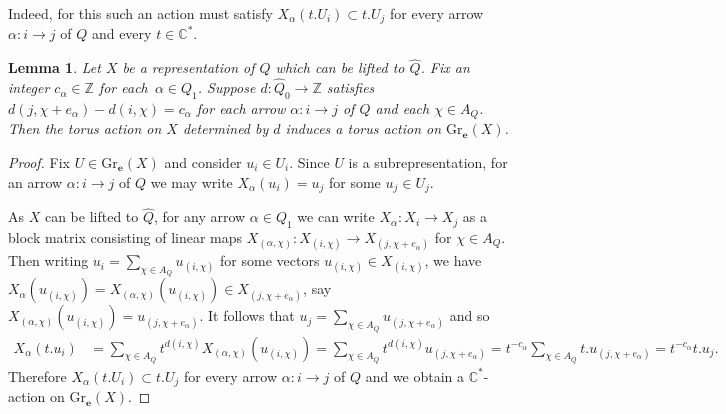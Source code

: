\documentclass{amsart}
\newtheorem{lemma}[theorem]{Lemma}
\numberwithin{equation}{section}
\newcommand{\bfe}{\mathbf{e}}
\newcommand{\Gr}{\mathrm{Gr}}
\newcommand{\CC}{\mathbb{C}}
\newcommand{\ZZ}{\mathbb{Z}}
\begin{document}
Indeed, for this such an action must satisfy $X_\alpha(t.U_i)\subset t.U_j$ for every arrow $\alpha:i\to j$ of $Q$ and every $t\in\CC^*$. 
\begin{lemma}
  Let $X$ be a representation of $Q$ which can be lifted to $\hat Q$.
  Fix an integer $c_\alpha\in\ZZ$ for each~$\alpha\in Q_1$.
  Suppose $d:\hat Q_0\to\ZZ$ satisfies $d(j,\chi+e_\alpha)-d(i,\chi)=c_\alpha$ for each arrow $\alpha:i\to j$ of $Q$ and each $\chi\in A_Q$.
  Then the torus action on $X$ determined by $d$ induces a torus action on $\Gr_\bfe(X)$.
\end{lemma}
\begin{proof} 
  Fix $U\in\Gr_\bfe(X)$ and consider $u_i\in U_i$.
  Since $U$ is a subrepresentation, for an arrow $\alpha:i\to j$ of $Q$ we may write $X_\alpha(u_i)=u_j$ for some $u_j\in U_j$.

  As $X$ can be lifted to $\hat Q$, for any arrow $\alpha\in Q_1$ we can write $X_\alpha:X_i\to X_j$ as a block matrix consisting of linear maps $X_{(\alpha,\chi)}:X_{(i,\chi)}\to X_{(j,\chi+e_\alpha)}$ for $\chi\in A_Q$.
  Then writing $u_i=\sum_{\chi\in A_Q} u_{(i,\chi)}$ for some vectors $u_{(i,\chi)}\in X_{(i,\chi)}$, we have $X_\alpha(u_{(i,\chi)})=X_{(\alpha,\chi)}(u_{(i,\chi)})\in X_{(j,\chi+e_\alpha)}$, say $X_{(\alpha,\chi)}(u_{(i,\chi)})=u_{(j,\chi+e_\alpha)}$.
  It follows that $u_j=\sum_{\chi\in A_Q} u_{(j,\chi+e_\alpha)}$ and so
  \begin{align*}
    X_\alpha(t.u_i)
    &=\sum\limits_{\chi\in A_Q} t^{d(i,\chi)}X_{(\alpha,\chi)}(u_{(i,\chi)})=\sum\limits_{\chi\in A_Q} t^{d(i,\chi)}u_{(j,\chi+e_\alpha)}=t^{-c_\alpha}\sum\limits_{\chi\in A_Q} t.u_{(j,\chi+e_\alpha)}=t^{-c_\alpha} t.u_j.
  \end{align*}
  Therefore $X_\alpha(t.U_i)\subset t.U_j$ for every arrow $\alpha:i\to j$ of $Q$ and we obtain a $\CC^*$-action on $\Gr_\bfe(X)$.
\end{proof}
\end{document}
